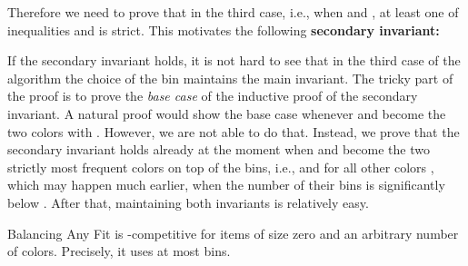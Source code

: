 \documentclass[11pt,a4paper]{article}
\begin{document}
Therefore we need to prove that in the third case, i.e., when
 and , at least one of inequalities  and  is strict. This motivates the following
\textbf{secondary invariant:} 

If the secondary invariant holds, it is not hard to see that in the third
case of the algorithm the choice of the bin maintains the main
invariant. The tricky part of the proof is to prove the {\em base
case} of the inductive proof of the secondary invariant.
A natural proof would show the base case
whenever  and  become the two colors with
. However, we are
not able to do that. Instead, 
we prove that the secondary invariant
holds already at the moment when  and 
become the two strictly most frequent colors on top of the bins, i.e.,
 and  for all other colors , which may
happen much earlier, when the number of their bins is significantly below . 
After that, maintaining both invariants is relatively easy.

\begin{theorem} \label{thm:optAlg}
Balancing Any Fit is -com\-pe\-ti\-ti\-ve for items of
size zero and an arbitrary number of colors. Precisely, it uses at most
 bins.
\end{theorem}
\end{document}
